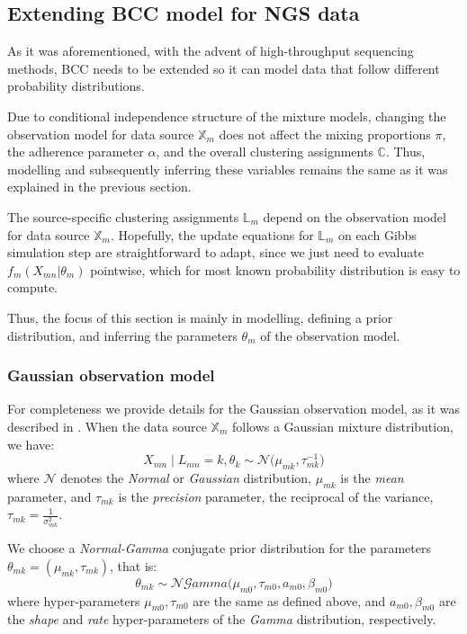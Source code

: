 \subsection{Extending BCC model for NGS data}\label{integr-extension-subsect}
As it was aforementioned, with the advent of high-throughput sequencing methods, BCC needs to be extended so it can model data that follow different probability distributions.

Due to conditional independence structure of the mixture models, changing the observation model for data source $\mathbb{X}_{m}$ does not affect the mixing proportions $\pi$, the adherence parameter $\alpha$, and the overall clustering assignments $\mathbb{C}$. Thus, modelling and subsequently inferring these variables remains the same as it was explained in the previous section.

The source-specific clustering assignments $\mathbb{L}_{m}$ depend on the observation model for data source $\mathbb{X}_{m}$. Hopefully, the update equations for $\mathbb{L}_{m}$ on each Gibbs simulation step are straightforward to adapt, since we just need to evaluate $f_{m}(X_{mn}|\theta_{m})$ pointwise, which for most known probability distribution is easy to compute.

Thus, the focus of this section is mainly in modelling, \ie defining a prior distribution, and inferring the parameters $\theta_{m}$ of the observation model. 

\subsubsection*{Gaussian observation model}
For completeness we provide details for the Gaussian observation model, as it was described in \citet{Lock2013}. When the data source $\mathbb{X}_{m}$ follows a Gaussian mixture distribution, we have:
\begin{equation}
	X_{mn} \mid L_{mn} = k, \theta_{k} \sim \mathcal{N}\big(\mu_{mk}, \tau_{mk}^{-1}\big)
\end{equation}
where $\mathcal{N}$ denotes the \emph{Normal} or \emph{Gaussian} distribution, $\mu_{mk}$ is the \emph{mean} parameter, and $\tau_{mk}$ is the \emph{precision} parameter, \ie the reciprocal of the variance, $\tau_{mk} = \frac{1}{\sigma_{mk}^{2}}$.

We choose a \emph{Normal-Gamma} conjugate prior distribution for the parameters $\theta_{mk} = (\mu_{mk}, \tau_{mk})$, that is:
\begin{equation}
	\theta_{mk} \sim \mathcal{NG}amma\big(\mu_{m0}, \tau_{m0}, \mathit{a}_{m0}, \beta_{m0}\big)
\end{equation}
where hyper-parameters $\mu_{m0}, \tau_{m0}$ are the same as defined above, and $\mathit{a}_{m0}, \beta_{m0}$ are the \emph{shape} and \emph{rate} hyper-parameters of the \emph{Gamma} distribution, respectively.

